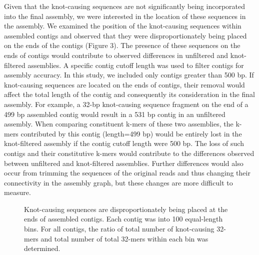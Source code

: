 \documentclass[11pt]{article} %
\begin{document}
Given that the knot-causing sequences are not significantly being incorporated into the final assembly, we were interested in the location of these sequences in the assembly.  We examined the position of the knot-causing sequences within assembled contigs and observed that they were disproportionately being placed on the ends of the contigs (Figure 3).  The presence of these sequences on the ends of contigs would contribute to observed differences in unfiltered and knot-filtered assemblies.  A specific contig cutoff length was used to filter contigs for assembly accuracy.  In this study, we included only contigs greater than 500 bp.  If knot-causing sequences are located on the ends of contigs, their removal would affect the total length of the contig and consequently its consideration in the final assembly.  For example, a 32-bp knot-causing sequence fragment on the end of a 499 bp assembled contig would result in a 531 bp contig in an unfiltered assembly.  When comparing constituent k-mers of these two assemblies, the k-mers contributed by this contig (length=499 bp) would be entirely lost in the knot-filtered assembly if the contig cutoff length were 500 bp.  The loss of such contigs and their constitutive k-mers would contribute to the differences observed between unfiltered and knot-filtered assemblies.  Further differences would also occur from trimming the sequences of the original reads and thus changing their connectivity in the assembly graph, but these changes are more difficult to measure.  

\begin{figure}
\caption{Knot-causing sequences are disproportionately being placed at the ends of assembled contigs.  Each contig was into 100 equal-length bins.  For all contigs, the ratio of total number of knot-causing 32-mers and total number of total 32-mers within each bin was determined.}
\end{figure}
\end{document}
